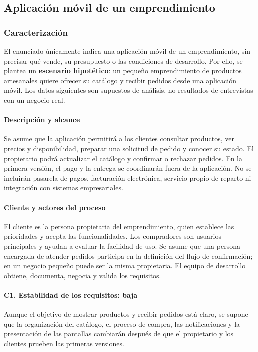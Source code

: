 \subsection{Aplicación móvil de un emprendimiento}
\label{sec:escenario-app}

\subsubsection{Caracterización}

El enunciado únicamente indica una aplicación móvil de un emprendimiento,
sin precisar qué vende, su presupuesto o las condiciones de desarrollo.
Por ello, se plantea un \textbf{escenario hipotético}: un pequeño
emprendimiento de productos artesanales quiere ofrecer su catálogo y recibir
pedidos desde una aplicación móvil. Los datos siguientes son supuestos de
análisis, no resultados de entrevistas con un negocio real.

\paragraph{Descripción y alcance}
Se asume que la aplicación permitirá a los clientes consultar productos,
ver precios y disponibilidad, preparar una solicitud de pedido y conocer su
estado. El propietario podrá actualizar el catálogo y confirmar o rechazar
pedidos. En la primera versión, el pago y la entrega se coordinarán fuera de
la aplicación. No se incluirán pasarela de pagos, facturación electrónica,
servicio propio de reparto ni integración con sistemas empresariales.

\paragraph{Cliente y actores del proceso}
El cliente es la persona propietaria del emprendimiento, quien establece las
prioridades y acepta las funcionalidades. Los compradores son usuarios
principales y ayudan a evaluar la facilidad de uso. Se asume que una persona
encargada de atender pedidos participa en la definición del flujo de
confirmación; en un negocio pequeño puede ser la misma propietaria. El
equipo de desarrollo obtiene, documenta, negocia y valida los requisitos.

\paragraph{C1. Estabilidad de los requisitos: baja}
Aunque el objetivo de mostrar productos y recibir pedidos está claro, se
supone que la organización del catálogo, el proceso de compra, las
notificaciones y la presentación de las pantallas cambiarán después de que
el propietario y los clientes prueben las primeras versiones.

